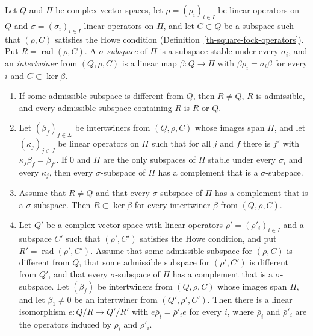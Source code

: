 \begin{lemma}\label{th-square-radical}
Let $Q$ and $\Pi$ be complex vector spaces, let $\rho=(\rho_i)_{i\in I}$ be
linear operators on $Q$ and $\sigma=(\sigma_i)_{i\in I}$ linear operators on
$\Pi$, and let $C\subset Q$ be a subspace such that $(\rho,C)$ satisfies the
Howe condition (Definition~\ref{th-square-fock-operators}). Put
$R=\operatorname{rad}(\rho,C)$. A \emph{$\sigma$-subspace} of $\Pi$ is a
subspace stable under every $\sigma_i$, and an \emph{intertwiner} from
$(Q,\rho,C)$ is a linear map $\beta\colon Q\to\Pi$ with
$\beta\rho_i=\sigma_i\beta$ for every $i$ and $C\subset\ker\beta$.
\begin{enumerate}
\item If some admissible subspace is different from $Q$, then $R\neq Q$, $R$
  is admissible, and every admissible subspace containing $R$ is $R$ or $Q$.
\item Let $(\beta_f)_{f\in\Sigma}$ be intertwiners from $(Q,\rho,C)$ whose
  images span $\Pi$, and let $(\kappa_j)_{j\in J}$ be linear operators on $\Pi$
  such that for all $j$ and $f$ there is $f'$ with
  $\kappa_j\beta_f=\beta_{f'}$. If $0$ and $\Pi$ are the only subspaces of
  $\Pi$ stable under every $\sigma_i$ and every $\kappa_j$, then every
  $\sigma$-subspace of $\Pi$ has a complement that is a $\sigma$-subspace.
\item Assume that $R\neq Q$ and that every $\sigma$-subspace of $\Pi$ has a
  complement that is a $\sigma$-subspace. Then $R\subset\ker\beta$ for every
  intertwiner $\beta$ from $(Q,\rho,C)$.
\item Let $Q'$ be a complex vector space with linear operators
  $\rho'=(\rho'_i)_{i\in I}$ and a subspace $C'$ such that $(\rho',C')$
  satisfies the Howe condition, and put $R'=\operatorname{rad}(\rho',C')$.
  Assume that some admissible subspace for $(\rho,C)$ is different from $Q$,
  that some admissible subspace for $(\rho',C')$ is different from $Q'$, and
  that every $\sigma$-subspace of $\Pi$ has a complement that is a
  $\sigma$-subspace. Let $(\beta_f)$ be intertwiners from $(Q,\rho,C)$ whose
  images span $\Pi$, and let $\beta_1\neq0$ be an intertwiner from
  $(Q',\rho',C')$. Then there is a linear isomorphism $e\colon Q/R\to Q'/R'$
  with $e\bar\rho_i=\bar\rho'_ie$ for every $i$, where $\bar\rho_i$ and
  $\bar\rho'_i$ are the operators induced by $\rho_i$ and $\rho'_i$.
\end{enumerate}
\end{lemma}
